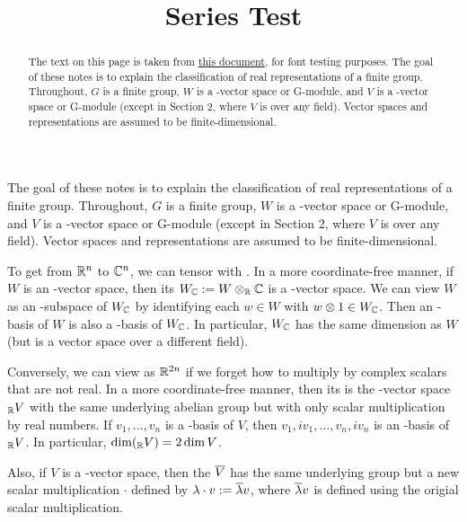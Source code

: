 \documentclass{scrartcl}
\title{Series Test}
\begin{document}
\maketitle

\begin{abstract}
The text on this page is taken from \href{http://www-math.mit.edu/~poonen/715/real_representations.pdf}{this document}, for font testing purposes. The goal of these notes is to explain the classification of real representations of a finite
group. Throughout, $G$ is a finite group, $W$ is a \RR-vector space or \RR G-module, and $V$ is a
\CC-vector space or \CC G-module (except in Section 2, where $V$ is over any field). Vector spaces
and representations are assumed to be finite-dimensional.

\end{abstract}

\newpset


The goal of these notes is to explain the classification of real representations of a finite
group. Throughout, $G$ is a finite group, $W$ is a \RR-vector space or \RR G-module, and $V$ is a
\CC-vector space or \CC G-module (except in Section 2, where $V$ is over any field). Vector spaces
and representations are assumed to be finite-dimensional.

To get from $\mathbb R^n$ to $\mathbb C^n$, we can tensor with \CC. In a more coordinate-free
manner, if $W$ is an \RR-vector space, then its  $W_{\mathbb C} := W \otimes_{\mathbb R} \mathbb C$ is a \CC-vector
space. We can view $W$ as an \RR-subspace of $W_{\mathbb C}$ by identifying each $w \in W$ with $w \otimes 1 \in W_{\mathbb C}$.
Then an \RR-basis of $W$ is also a \CC-basis of $W_{\mathbb C}$. In particular, $W_{\mathbb C}$ has the same dimension as
$W$ (but is a vector space over a different field).

Conversely, we can view \CCn as $\mathbb R^{2n}$ if we forget how to multiply by complex scalars that are not real. In a more coordinate-free manner, then its  is the \RR-vector space $_{\mathbb R} V$ with the same underlying abelian group but with only scalar multiplication by real numbers. If $v_1,\dots,v_n$ is a \CC-basis of $V$, then $v_1, iv_1,\dots,v_n,iv_n$ is an \RR-basis of $_{\mathbb R} V$. In particular, $\dim(_{\mathbb R} V) = 2\dim V$.

Also, if $V$ is a \CC-vector space, then the  $\overline{V}$ has the same underlying group but a new scalar multiplication $\cdot$ defined by $\lambda\cdot v := \overline{\lambda}v$, where $\overline{\lambda}v$ is defined using the origial scalar multiplication.
\end{document}
